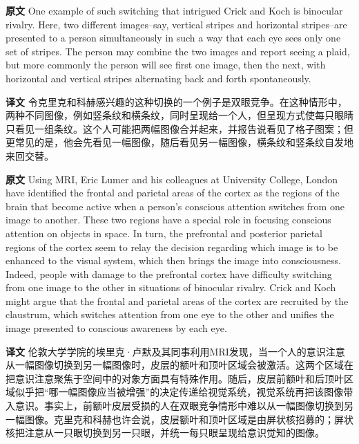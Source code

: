 \documentclass[UTF8,zihao=-4]{ctexart}
\newcommand{\BodyFont}{\fontsize{10.5pt}{15.5pt}\selectfont}
\newcommand{\origlabel}{\textbf{原文}\quad}
\newcommand{\translabel}{\textbf{译文}\quad}
\newenvironment{enblock}{\par\noindent\begingroup\BodyFont\origlabel}{\par\endgroup}
\newenvironment{zhblock}{\par\noindent\begingroup\BodyFont\translabel}{\par\endgroup\vspace{0.35em}}
\begin{document}
\begin{enblock}
One example of such switching that intrigued Crick and Koch is binocular rivalry. Here, two different images--say, vertical stripes and horizontal stripes--are presented to a person simultaneously in such a way that each eye sees only one set of stripes. The person may combine the two images and report seeing a plaid, but more commonly the person will see first one image, then the next, with horizontal and vertical stripes alternating back and forth spontaneously.
\end{enblock}
\begin{zhblock}
令克里克和科赫感兴趣的这种切换的一个例子是双眼竞争。在这种情形中，两种不同图像，例如竖条纹和横条纹，同时呈现给一个人，但呈现方式使每只眼睛只看见一组条纹。这个人可能把两幅图像合并起来，并报告说看见了格子图案；但更常见的是，他会先看见一幅图像，随后看见另一幅图像，横条纹和竖条纹自发地来回交替。\end{zhblock}

\begin{enblock}
Using MRI, Eric Lumer and his colleagues at University College, London have identified the frontal and parietal areas of the cortex as the regions of the brain that become active when a person's conscious attention switches from one image to another. These two regions have a special role in focusing conscious attention on objects in space. In turn, the prefrontal and posterior parietal regions of the cortex seem to relay the decision regarding which image is to be enhanced to the visual system, which then brings the image into consciousness. Indeed, people with damage to the prefrontal cortex have difficulty switching from one image to the other in situations of binocular rivalry. Crick and Koch might argue that the frontal and parietal areas of the cortex are recruited by the claustrum, which switches attention from one eye to the other and unifies the image presented to conscious awareness by each eye.
\end{enblock}
\begin{zhblock}
伦敦大学学院的埃里克·卢默及其同事利用MRI发现，当一个人的意识注意从一幅图像切换到另一幅图像时，皮层的额叶和顶叶区域会被激活。这两个区域在把意识注意聚焦于空间中的对象方面具有特殊作用。随后，皮层前额叶和后顶叶区域似乎把“哪一幅图像应当被增强”的决定传递给视觉系统，视觉系统再把该图像带入意识。事实上，前额叶皮层受损的人在双眼竞争情形中难以从一幅图像切换到另一幅图像。克里克和科赫也许会说，皮层额叶和顶叶区域是由屏状核招募的；屏状核把注意从一只眼切换到另一只眼，并统一每只眼呈现给意识觉知的图像。\end{zhblock}
\end{document}
